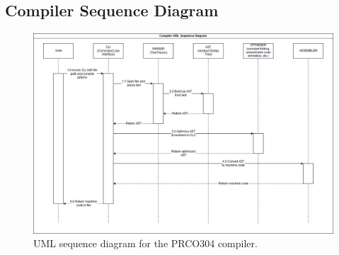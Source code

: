\documentclass[11pt,a4paper]{report}
\newcommand{\scname}{PRCO304}
\begin{document}
\subsection{Compiler Sequence Diagram}
\label{sect:compiler_seq_uml}
\begin{figure}[H]
\begin{center}
\includegraphics[scale=0.4]{fig_compiler_uml_seq}
\end{center}
\caption{UML sequence diagram for the \scname{} compiler.}
\label{fig:hld}
\end{figure}
\end{document}
